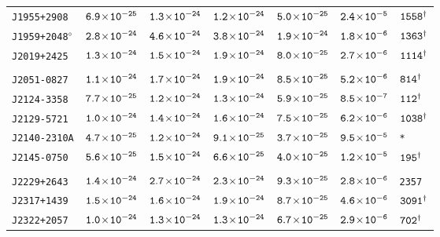 \begin{longtable}{l | c | c | c | c | c | l}
\scriptsize{\tt{J1955+2908}} & \scriptsize{$\tt{6.9\!\times\!10^{-25}}$} & \scriptsize{$\tt{1.3\!\times\!10^{-24}}$} & \scriptsize{$\tt{1.2\!\times\!10^{-24}}$} & \scriptsize{$\tt{5.0\!\times\!10^{-25}}$} & \scriptsize{$\tt{2.4\!\times\!10^{-5}}$} & \scriptsize{$\tt{1558^{\dagger}}$} \\[-16pt] 
\scriptsize{\tt{J1959+2048}$^{\diamond}$} & \scriptsize{$\tt{2.8\!\times\!10^{-24}}$} &
\scriptsize{$\tt{4.6\!\times\!10^{-24}}$} & \scriptsize{$\tt{3.8\!\times\!10^{-24}}$} & \scriptsize{$\tt{1.9\!\times\!10^{-24}}$}
& \scriptsize{$\tt{1.8\!\times\!10^{-6}}$} & \scriptsize{$\tt{1363^{\dagger}}$} \\[-16pt] 
\scriptsize{\tt{J2019+2425}} & \scriptsize{$\tt{1.3\!\times\!10^{-24}}$} & \scriptsize{$\tt{1.5\!\times\!10^{-24}}$} & \scriptsize{$\tt{1.9\!\times\!10^{-24}}$} & \scriptsize{$\tt{8.0\!\times\!10^{-25}}$} & \scriptsize{$\tt{2.7\!\times\!10^{-6}}$} & \scriptsize{$\tt{1114^{\dagger}}$} \\[-16pt] 
\\[-20pt] 
\scriptsize{\tt{J2051-0827}} & \scriptsize{$\tt{1.1\!\times\!10^{-24}}$} & \scriptsize{$\tt{1.7\!\times\!10^{-24}}$} & \scriptsize{$\tt{1.9\!\times\!10^{-24}}$} & \scriptsize{$\tt{8.5\!\times\!10^{-25}}$} & \scriptsize{$\tt{5.2\!\times\!10^{-6}}$} & \scriptsize{$\tt{814^{\dagger}}$} \\[-16pt] 
\scriptsize{\tt{J2124-3358}} & \scriptsize{$\tt{7.7\!\times\!10^{-25}}$} & \scriptsize{$\tt{1.2\!\times\!10^{-24}}$} & \scriptsize{$\tt{1.3\!\times\!10^{-24}}$} & \scriptsize{$\tt{5.9\!\times\!10^{-25}}$} & \scriptsize{$\tt{8.5\!\times\!10^{-7}}$} & \scriptsize{$\tt{112^{\dagger}}$} \\[-16pt] 
\scriptsize{\tt{J2129-5721}} & \scriptsize{$\tt{1.0\!\times\!10^{-24}}$} & \scriptsize{$\tt{1.4\!\times\!10^{-24}}$} & \scriptsize{$\tt{1.6\!\times\!10^{-24}}$} & \scriptsize{$\tt{7.5\!\times\!10^{-25}}$} & \scriptsize{$\tt{6.2\!\times\!10^{-6}}$} & \scriptsize{$\tt{1038^{\dagger}}$} \\[-16pt] 
\scriptsize{\tt{J2140-2310A}} & \scriptsize{$\tt{4.7\!\times\!10^{-25}}$} & \scriptsize{$\tt{1.2\!\times\!10^{-24}}$} & \scriptsize{$\tt{9.1\!\times\!10^{-25}}$} & \scriptsize{$\tt{3.7\!\times\!10^{-25}}$} & \scriptsize{$\tt{9.5\!\times\!10^{-5}}$} & \scriptsize{\tt{*}} \\[-16pt] 
\scriptsize{\tt{J2145-0750}} & \scriptsize{$\tt{5.6\!\times\!10^{-25}}$} & \scriptsize{$\tt{1.5\!\times\!10^{-24}}$} & \scriptsize{$\tt{6.6\!\times\!10^{-25}}$} & \scriptsize{$\tt{4.0\!\times\!10^{-25}}$} & \scriptsize{$\tt{1.2\!\times\!10^{-5}}$} & \scriptsize{$\tt{195^{\dagger}}$} \\[-16pt] 
\\[-20pt] 
\scriptsize{\tt{J2229+2643}} & \scriptsize{$\tt{1.4\!\times\!10^{-24}}$} & \scriptsize{$\tt{2.7\!\times\!10^{-24}}$} & \scriptsize{$\tt{2.3\!\times\!10^{-24}}$} &\scriptsize{$\tt{9.3\!\times\!10^{-25}}$} & \scriptsize{$\tt{2.8\!\times\!10^{-6}}$} & \scriptsize{\tt{2357}} \\[-16pt] 
\scriptsize{\tt{J2317+1439}} & \scriptsize{$\tt{1.5\!\times\!10^{-24}}$} & \scriptsize{$\tt{1.6\!\times\!10^{-24}}$} & \scriptsize{$\tt{1.9\!\times\!10^{-24}}$} & \scriptsize{$\tt{8.7\!\times\!10^{-25}}$} & \scriptsize{$\tt{4.6\!\times\!10^{-6}}$} & \scriptsize{$\tt{3091^{\dagger}}$} \\[-16pt] 
\scriptsize{\tt{J2322+2057}} & \scriptsize{$\tt{1.0\!\times\!10^{-24}}$} & \scriptsize{$\tt{1.3\!\times\!10^{-24}}$} & \scriptsize{$\tt{1.3\!\times\!10^{-24}}$} & \scriptsize{$\tt{6.7\!\times\!10^{-25}}$} & \scriptsize{$\tt{2.9\!\times\!10^{-6}}$} & \scriptsize{$\tt{702^{\dagger}}$} \\[-16pt] 
\end{longtable}
